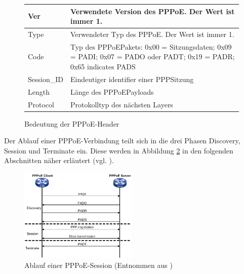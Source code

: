 \documentclass[journal,11pt]{IEEEtran}
\begin{document}
%
%
\begin{figure}[h!]
\begin{tabular}{|l|p{6.2cm}|}
\hline 
Ver & Verwendete Version des PPPoE. Der Wert ist immer 1.\\ 
\hline 
Type & Verwendeter Typ des PPPoE. Der Wert ist immer 1.\\ 
\hline 
Code & Typ des PPPoE\-Pakets: 0x00 = Sitzungsdaten; 0x09 = PADI; 0x07 = PADO oder PADT;
0x19 = PADR; 0x65 indicates PADS\\ 
\hline 
Session\_ID & Eindeutiger identifier einer PPP\-Sitzung\\ 
\hline 
Length & Länge des PPPoE\-Payloads\\ 
\hline 
Protocol & Protokolltyp des nächsten Layers\\ 
\hline
\end{tabular}
\caption{Bedeutung der PPPoE-Header}
\label{tab:PPPoE_fields}
\end{figure}
%
Der Ablauf einer PPPoE-Verbindung teilt sich in die drei Phasen Discovery, Session und Terminate
ein. Diese werden in Abbildung \ref{fig:pppoe_h3c_sequenz} in den folgenden Abschnitten näher erläutert (vgl. \cite{RFC2516}).\\
%
\begin{figure}[h!]
 \centering
  \includegraphics[width=0.5\textwidth]{img/pppoe_sequenz1.png}
 \caption{Ablauf einer PPPoE-Session (Entnommen aus \cite{pppoe_h3c})}
 \label{fig:pppoe_h3c_sequenz}
\end{figure}
%
\\
\end{document}
